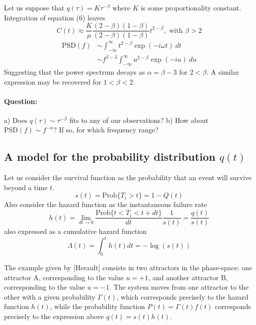\documentclass[10pt,a4paper]{article}
\newcommand{\prob}[1]{\mathrm{Prob}\lbrace #1\rbrace}
\newcommand{\power}[1]{\mathrm{PSD} ( #1 ) }
\begin{document}
  Let us suppose that $q(\tau) = K \tau^{-\beta}$ where $K$ is some
  proportionality constant. Integration of equation (6) leaves
  \begin{equation}
    C(t) \approx \frac{K}{\mu} \frac{(2-\beta)(1-\beta)}{(2-\beta)(1-\beta)} t^{2-\beta}, \mbox{ with }
    \beta > 2
  \end{equation}
  \begin{align*}
    \power{f} &\sim \int_{-\infty}^{\infty} t^{2-\beta} \exp{(-i\omega t)} ~dt
    \\
                  &\sim f^{\beta-3} \int_{-\infty}^{\infty} u^{2-\beta} \exp{(-iu)} ~du
  \end{align*}
  Suggesting that the power spectrum decays as $\alpha = \beta - 3$ for $2 < \beta$.
  A similar expression may be recovered for $1 < \beta < 2$.

  \paragraph{Question: } a) Does $q(\tau) \sim \tau^{-\beta}$ fits to any of our
  observations? b) How about $\power{f} \sim f^{-\alpha}$? If so, for which
  frequency range?


  \subsection{ A model for the probability distribution $q(t)$}

  Let us consider the survival function as the probability that an event will
  survive beyond a time $t$.
  \begin{equation}
    s(t) = \prob{T_i > t} = 1 - Q(t)
  \end{equation}
  Also consider the hazard function as the instantaneous failure rate
  \begin{equation}
    h(t) = \lim_{dt\to 0} \frac{\prob{t < T_i < t + dt}}{dt} \frac{1}{s(t)} = \frac{q(t)}{s(t)}
  \end{equation}
  also expressed as a cumulative hazard function
  \begin{equation}
    \Lambda(t) = \int_0^t h(t) dt = -\log{(s(t))}
  \end{equation}

  The example given by [Herault] consists in two attractors in the phase-space:
  one attractor A, corresponding to the value $u=+1$, and another attractor B,
  corresponding to the value $u=-1$. The system moves from one attractor to the
  other with a given probability $\Gamma(t)$, which corresponds precisely to
  the hazard function $h(t)$, while the probability function $P(t)=\Gamma(t)f(t)$
  corresponds precisely to the expression above $q(t)= s(t)h(t)$.
\end{document}
